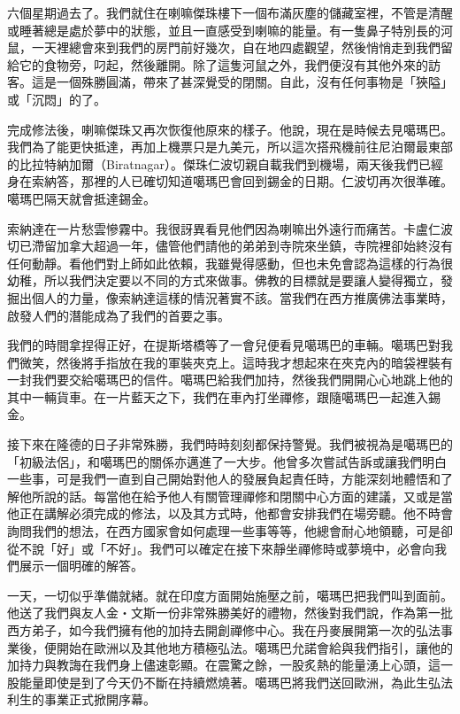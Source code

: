 六個星期過去了。我們就住在喇嘛傑珠樓下一個布滿灰塵的儲藏室裡，不管是清醒或睡著總是處於夢中的狀態，並且一直感受到喇嘛的能量。有一隻鼻子特別長的河鼠，一天裡總會來到我們的房門前好幾次，自在地四處觀望，然後悄悄走到我們留給它的食物旁，叼起，然後離開。除了這隻河鼠之外，我們便沒有其他外來的訪客。這是一個殊勝圓滿，帶來了甚深覺受的閉關。自此，沒有任何事物是「狹隘」或「沉悶」的了。

完成修法後，喇嘛傑珠又再次恢復他原來的樣子。他說，現在是時候去見噶瑪巴。我們為了能更快抵達，再加上機票只是九美元，所以這次搭飛機前往尼泊爾最東部的比拉特納加爾（Biratnagar）。傑珠仁波切親自載我們到機場，兩天後我們已經身在索納答，那裡的人已確切知道噶瑪巴會回到錫金的日期。仁波切再次很準確。噶瑪巴隔天就會抵達錫金。

索納達在一片愁雲慘霧中。我很訝異看見他們因為喇嘛出外遠行而痛苦。卡盧仁波切已滯留加拿大超過一年，儘管他們請他的弟弟到寺院來坐鎮，寺院裡卻始終沒有任何動靜。看他們對上師如此依賴，我雖覺得感動，但也未免會認為這樣的行為很幼稚，所以我們決定要以不同的方式來做事。佛教的目標就是要讓人變得獨立，發掘出個人的力量，像索納達這樣的情況著實不該。當我們在西方推廣佛法事業時，啟發人們的潛能成為了我們的首要之事。

我們的時間拿捏得正好，在提斯塔橋等了一會兒便看見噶瑪巴的車輛。噶瑪巴對我們微笑，然後將手指放在我的軍裝夾克上。這時我才想起來在夾克內的暗袋裡裝有一封我們要交給噶瑪巴的信件。噶瑪巴給我們加持，然後我們開開心心地跳上他的其中一輛貨車。在一片藍天之下，我們在車內打坐禪修，跟隨噶瑪巴一起進入錫金。

接下來在隆德的日子非常殊勝，我們時時刻刻都保持警覺。我們被視為是噶瑪巴的「初級法侶」，和噶瑪巴的關係亦邁進了一大步。他曾多次嘗試告訴或讓我們明白一些事，可是我們一直到自己開始對他人的發展負起責任時，方能深刻地體悟和了解他所說的話。每當他在給予他人有關管理禪修和閉關中心方面的建議，又或是當他正在講解必須完成的修法，以及其方式時，他都會安排我們在場旁聽。他不時會詢問我們的想法，在西方國家會如何處理一些事等等，他總會耐心地領聽，可是卻從不說「好」或「不好」。我們可以確定在接下來靜坐禪修時或夢境中，必會向我們展示一個明確的解答。

一天，一切似乎準備就緒。就在印度方面開始施壓之前，噶瑪巴把我們叫到面前。他送了我們與友人金‧文斯一份非常殊勝美好的禮物，然後對我們說，作為第一批西方弟子，如今我們擁有他的加持去開創禪修中心。我在丹麥展開第一次的弘法事業後，便開始在歐洲以及其他地方積極弘法。噶瑪巴允諾會給與我們指引，讓他的加持力與教誨在我們身上儘速彰顯。在震驚之餘，一股炙熱的能量湧上心頭，這一股能量即使是到了今天仍不斷在持續燃燒著。噶瑪巴將我們送回歐洲，為此生弘法利生的事業正式掀開序幕。

